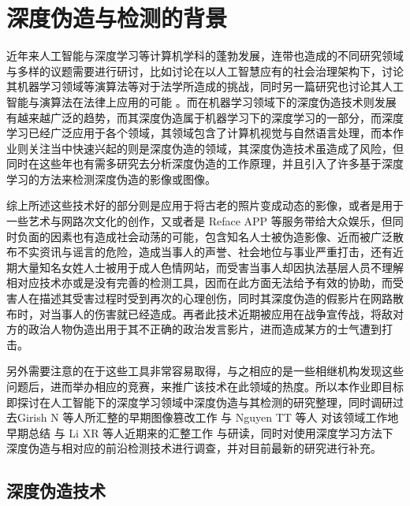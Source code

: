 \chapter{深度伪造与检测的背景}
\label{chap:1}
近年来人工智能与深度学习等计算机学科的蓬勃发展，连带也造成的不同研究领域与多样的议题需要进行研讨，比如讨论在以人工智慧应有的社会治理架构下，讨论其机器学习领域等演算法等对于法学所造成的挑战\cite{law01}，同时另一篇研究也讨论其人工智能与演算法在法律上应用的可能 \cite{law03}。而在机器学习领域下的深度伪造技术则发展有越来越广泛的趋势，而其深度伪造属于机器学习下的深度学习的一部分，而深度学习已经广泛应用于各个领域，其领域包含了计算机视觉与自然语言处理，而本作业则关注当中快速兴起的则是深度伪造的领域，其深度伪造技术\cite{list1101}虽造成了风险，但同时在这些年也有需多研究去分析深度伪造的工作原理，并且引入了许多基于深度学习的方法来检测深度伪造的影像或图像。

综上所述这些技术好的部分则是应用于将古老的照片变成动态的影像，或者是用于一些艺术与网路次文化的创作，又或者是 Reface APP\cite{list1102} 等服务带给大众娱乐，但同时负面的因素也有造成社会动荡的可能，包含知名人士被伪造影像、近而被广泛散布不实资讯与谣言的危险，造成当事人的声誉、社会地位与事业严重打击，还有近期大量知名女姓人士被用于成人色情网站，而受害当事人却因执法基层人员不理解相对应技术亦或是没有完善的检测工具，因而在此方面无法给予有效的协助，而受害人在描述其受害过程时受到再次的心理创伤，同时其深度伪造的假影片在网路散布时，对当事人的伤害就已经造成。再者此技术近期被应用在战争宣传战，将敌对方的政治人物伪造出用于其不正确的政治发言影片，进而造成某方的士气遭到打击。


另外需要注意的在于这些工具非常容易取得，与之相应的是一些相继机构发现这些问题后，进而举办相应的竞赛\cite{list1103}，来推广该技术在此领域的热度。所以本作业即目标即探讨在人工智能下的深度学习领域中深度伪造与其检测的研究整理，同时调研过去Girish N 等人所汇整的早期图像篡改工作 \cite{girish2019review}与 Nguyen TT 等人 对该领域工作地早期总结 \cite{nguyen2019deep}与 Li XR 等人近期来的汇整工作\cite{2021496} 与研读，同时对使用深度学习方法下深度伪造与相对应的前沿检测技术进行调查，并对目前最新的研究进行补充。

\section{深度伪造技术}

